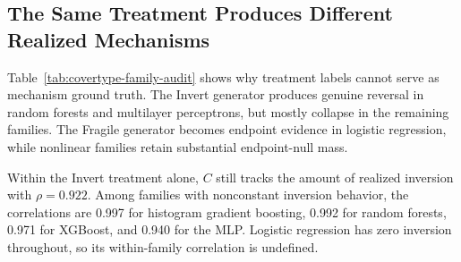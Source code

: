 \subsection{The Same Treatment Produces Different Realized Mechanisms}
\label{app:covertype-family-audit}

Table~\ref{tab:covertype-family-audit} shows why treatment labels cannot serve as mechanism ground truth. The Invert generator produces genuine reversal in random forests and multilayer perceptrons, but mostly collapse in the remaining families. The Fragile generator becomes endpoint evidence in logistic regression, while nonlinear families retain substantial endpoint-null mass.

\begin{table}[!tb]
\centering
\caption{Model-family audit. Direction columns average the Invert regime across two strengths and three seeds. Fragility columns average the Fragile regime across three seeds. ``Active'' is the endpoint-active fraction; ``Null change'' is the alternate-context prediction-change rate on endpoint-null examples.}
\label{tab:covertype-family-audit}
{}
\end{table}

Within the Invert treatment alone, $C$ still tracks the amount of realized inversion with $\rho=0.922$. Among families with nonconstant inversion behavior, the correlations are 0.997 for histogram gradient boosting, 0.992 for random forests, 0.971 for XGBoost, and 0.940 for the MLP. Logistic regression has zero inversion throughout, so its within-family correlation is undefined.

